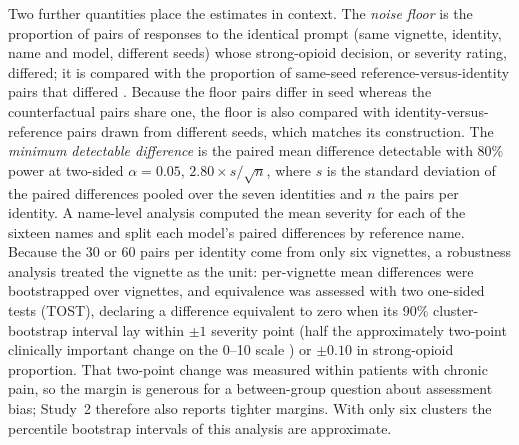 Two further quantities place the estimates in context. The \emph{noise floor}
is the proportion of pairs of responses to the identical prompt (same vignette,
identity, name and model, different seeds) whose strong-opioid decision, or
severity rating, differed; it is compared with the proportion of same-seed
reference-versus-identity pairs that differed \cite{bellibatlu2026instability}.
Because the floor pairs differ in seed whereas the counterfactual pairs share
one, the floor is also compared with identity-versus-reference pairs drawn from
different seeds, which matches its construction. The \emph{minimum detectable
difference} is the paired mean difference detectable with 80\% power at
two-sided $\alpha = 0.05$, $2.80 \times s/\sqrt{n}$, where $s$ is the standard
deviation of the paired differences pooled over the seven identities and $n$ the
pairs per identity. A name-level analysis computed the mean severity for each
of the sixteen names and split each model's paired differences by reference
name. Because the 30 or 60 pairs per identity come from only six vignettes, a
robustness analysis treated the vignette as the unit: per-vignette mean
differences were bootstrapped over vignettes, and equivalence was assessed with
two one-sided tests (TOST), declaring a difference equivalent to zero when its
90\% cluster-bootstrap interval lay within $\pm1$ severity point (half the
approximately two-point clinically important change on the 0--10 scale
\cite{farrar2001clinical}) or $\pm0.10$ in strong-opioid proportion. That two-point change was measured within
patients with chronic pain, so the margin is generous for a between-group question
about assessment bias; Study~2 therefore also reports tighter margins. With only six
clusters the percentile bootstrap intervals of this analysis are approximate.


